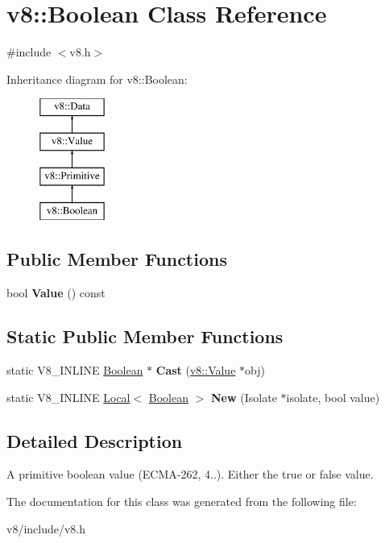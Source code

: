 \hypertarget{classv8_1_1Boolean}{}\section{v8\+:\+:Boolean Class Reference}
\label{classv8_1_1Boolean}


{\ttfamily \#include $<$v8.\+h$>$}

Inheritance diagram for v8\+:\+:Boolean\+:\begin{figure}[H]
\begin{center}
\leavevmode
\includegraphics[height=4.000000cm]{classv8_1_1Boolean}
\end{center}
\end{figure}
\subsection*{Public Member Functions}
\begin{DoxyCompactItemize}
\item 
\mbox{\label{classv8_1_1Boolean_a4d6e813daf80df3710518f5389cb7da5}} 
bool {\bfseries Value} () const
\end{DoxyCompactItemize}
\subsection*{Static Public Member Functions}
\begin{DoxyCompactItemize}
\item 
\mbox{\label{classv8_1_1Boolean_a92493565c4b9400825a0ff09780d7ff4}} 
static V8\+\_\+\+I\+N\+L\+I\+NE \mbox{\hyperlink{classv8_1_1Boolean}{Boolean}} $\ast$ {\bfseries Cast} (\mbox{\hyperlink{classv8_1_1Value}{v8\+::\+Value}} $\ast$obj)
\item 
\mbox{\label{classv8_1_1Boolean_aeb32aa1bf1853bc4c5f076ee6a8b9a0f}} 
static V8\+\_\+\+I\+N\+L\+I\+NE \mbox{\hyperlink{classv8_1_1Local}{Local}}$<$ \mbox{\hyperlink{classv8_1_1Boolean}{Boolean}} $>$ {\bfseries New} (Isolate $\ast$isolate, bool value)
\end{DoxyCompactItemize}


\subsection{Detailed Description}
A primitive boolean value (E\+C\+M\+A-\/262, 4..). Either the true or false value. 

The documentation for this class was generated from the following file\+:\begin{DoxyCompactItemize}
\item 
v8/include/v8.\+h\end{DoxyCompactItemize}
